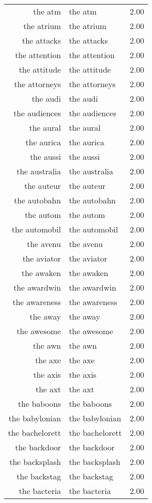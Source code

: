 \begin{table}[ht]
\begin{tabular}{rlr}
  the atm & the atm & 2.00 \\ 
  the atrium & the atrium & 2.00 \\ 
  the attacks & the attacks & 2.00 \\ 
  the attention & the attention & 2.00 \\ 
  the attitude & the attitude & 2.00 \\ 
  the attorneys & the attorneys & 2.00 \\ 
  the audi & the audi & 2.00 \\ 
  the audiences & the audiences & 2.00 \\ 
  the aural & the aural & 2.00 \\ 
  the aurica & the aurica & 2.00 \\ 
  the aussi & the aussi & 2.00 \\ 
  the australia & the australia & 2.00 \\ 
  the auteur & the auteur & 2.00 \\ 
  the autobahn & the autobahn & 2.00 \\ 
  the autom & the autom & 2.00 \\ 
  the automobil & the automobil & 2.00 \\ 
  the avenu & the avenu & 2.00 \\ 
  the aviator & the aviator & 2.00 \\ 
  the awaken & the awaken & 2.00 \\ 
  the awardwin & the awardwin & 2.00 \\ 
  the awareness & the awareness & 2.00 \\ 
  the away & the away & 2.00 \\ 
  the awesome & the awesome & 2.00 \\ 
  the awn & the awn & 2.00 \\ 
  the axe & the axe & 2.00 \\ 
  the axis & the axis & 2.00 \\ 
  the axt & the axt & 2.00 \\ 
  the baboons & the baboons & 2.00 \\ 
  the babylonian & the babylonian & 2.00 \\ 
  the bachelorett & the bachelorett & 2.00 \\ 
  the backdoor & the backdoor & 2.00 \\ 
  the backsplash & the backsplash & 2.00 \\ 
  the backstag & the backstag & 2.00 \\ 
  the bacteria & the bacteria & 2.00 \\ 

\end{tabular}
\end{table}
